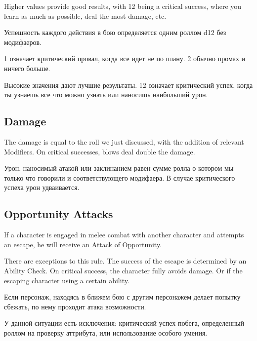 \documentclass[a5paper,11pt]{book}
\begin{document}
\begin{multicols}{2}
\begin{en}
Higher values provide good results, with 12 being a critical success, where you learn as much as possible, deal the most damage, etc.
\end{en}

\begin{ru}
Успешность каждого действия в бою определяется одним роллом d12 без модифаеров. 

1 означает критический провал, когда все идет не по плану. 2 обычно промах и ничего больше.

Высокие значения дают лучшие результаты. 12 означает критический успех, когда ты узнаешь все что можно узнать или наносишь наибольший урон.
\end{ru}

\subsection{Damage}
\begin{en}
The damage is equal to the roll we just discussed, with the addition of relevant Modifiers. On critical successes, blows deal double the damage.
\end{en}

\begin{ru}
Урон, наносимый атакой или заклинанием равен сумме ролла о котором мы только что говорили и соответствующего модифаера.  В случае критического успеха урон удваивается.
\end{ru}

\subsection{Opportunity Attacks}
\begin{en}
If a character is engaged in melee combat with another character and attempts an escape, he will receive an Attack of Opportunity.

There are exceptions to this rule. The success of the escape is determined by an Ability Check. On critical success, the character fully avoids damage. Or if the escaping character using a certain ability.
\end{en}

\begin{ru}
Если персонаж, находясь в ближем бою с другим персонажем делает попытку сбежать, по нему проходит атака возможности.

У данной ситуации есть исключения: критический успех побега, определенный роллом на проверку аттрибута, или использование особого умения.
\end{ru}


\end{multicols}
\end{document}
